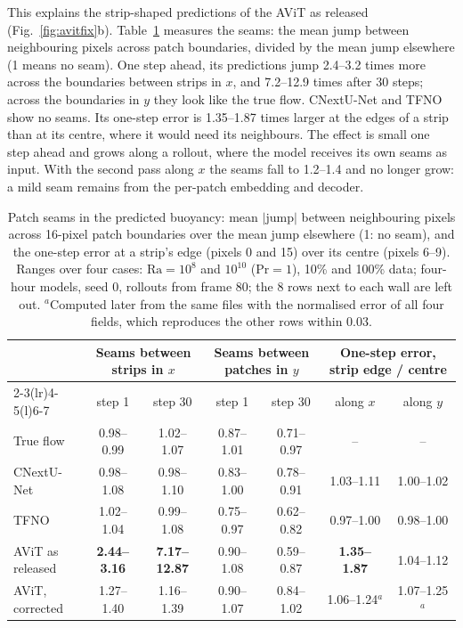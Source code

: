 \documentclass[11pt]{article}
\begin{document}
This explains the strip-shaped predictions of the AViT as released (Fig.~\ref{fig:avitfix}b).
Table~\ref{tab:avitseams} measures the seams: the mean jump between neighbouring pixels across patch boundaries,
divided by the mean jump elsewhere (1 means no seam). One step ahead, its predictions jump 2.4--3.2 times more across
the boundaries between strips in $x$, and 7.2--12.9 times after 30 steps; across the boundaries in $y$ they look like
the true flow. CNextU-Net and TFNO show no seams. Its one-step error is 1.35--1.87 times larger at the edges of a
strip than at its centre, where it would need its neighbours. The effect is small one step ahead and grows along a
rollout, where the model receives its own seams as input. With the second pass along $x$ the seams fall to 1.2--1.4
and no longer grow: a mild seam remains from the per-patch embedding and decoder.

\begin{table}[tp]
\centering\footnotesize
\begin{tabular}{@{}lcccccc@{}}
\toprule
& \multicolumn{2}{c}{Seams between strips in $x$} & \multicolumn{2}{c}{Seams between patches in $y$} &
\multicolumn{2}{c}{One-step error, strip edge / centre} \\
\cmidrule(lr){2-3}\cmidrule(lr){4-5}\cmidrule(l){6-7}
& step 1 & step 30 & step 1 & step 30 & along $x$ & along $y$ \\
\midrule
True flow & 0.98--0.99 & 1.02--1.07 & 0.87--1.01 & 0.71--0.97 & -- & -- \\
CNextU-Net & 0.98--1.08 & 0.98--1.10 & 0.83--1.00 & 0.78--0.91 & 1.03--1.11 & 1.00--1.02 \\
TFNO & 1.02--1.04 & 0.99--1.08 & 0.75--0.97 & 0.62--0.82 & 0.97--1.00 & 0.98--1.00 \\
AViT as released & \textbf{2.44--3.16} & \textbf{7.17--12.87} & 0.90--1.08 & 0.59--0.87 & \textbf{1.35--1.87} & 1.04--1.12 \\
AViT, corrected & 1.27--1.40 & 1.16--1.39 & 0.90--1.07 & 0.84--1.02 & 1.06--1.24$^{a}$ & 1.07--1.25$^{a}$ \\
\bottomrule
\end{tabular}
\caption{Patch seams in the predicted buoyancy: mean $|$jump$|$ between neighbouring pixels across 16-pixel patch
boundaries over the mean jump elsewhere (1: no seam), and the one-step error at a strip's edge (pixels 0 and 15)
over its centre (pixels 6--9). Ranges over four cases: $\mathrm{Ra}=10^8$ and $10^{10}$ ($\mathrm{Pr}=1$), 10\% and
100\% data; four-hour models, seed 0, rollouts from frame 80; the 8 rows next to each wall are left out.
$^{a}$Computed later from the same files with the normalised error of all four fields, which reproduces the other
rows within 0.03.}
\label{tab:avitseams}
\end{table}
\end{document}

